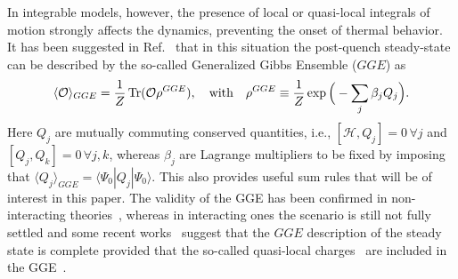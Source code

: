 \documentclass[11pt]{iopart}
\begin{document}
In integrable models, however, the presence of local or 
quasi-local integrals of motion strongly affects the dynamics, preventing the 
onset of thermal behavior. It has been suggested in Ref.~\cite{rigol-2007,
rigol-2008} that in this situation the post-quench steady-state can be described 
by the so-called Generalized Gibbs Ensemble ($GGE$) as 
%
\begin{equation}
\label{gge}
\langle{\mathcal O}\rangle_{GGE}=\frac{1}{Z}\mathop{\mathrm{Tr}}\nolimits({\mathcal O}\rho^{GGE}), 
\quad\textrm{with}\quad\rho^{GGE}\equiv\frac{1}{Z}\exp\Big(-\sum_j\beta_jQ_j\Big). 
\end{equation}
%
Here $Q_j$ are mutually commuting conserved quantities, i.e., $[{\mathcal H},Q_j]=0\,
\forall j$ and $[Q_j,Q_k]=0\,\forall j,k$, whereas $\beta_j$ are Lagrange multipliers 
to be fixed by imposing that  $\langle Q_j\rangle_{GGE}=\langle\Psi_0|Q_j|\Psi_0\rangle$. 
This also provides  useful sum rules that will be of interest in this paper. 
The validity of the GGE has been confirmed in non-interacting theories~\cite{calabrese-2006,
cramer-2008,barthel-2008,rossini-2009,calabrese-2011,cazalilla-2012,se-12,mossel-2012a,
collura-2013,fagotti-2013,kcc14,kcc14a,sotiriadis-2014,bkc-14}, whereas in interacting 
ones the scenario is still not fully settled and some recent works~\cite{ilievski-2015a,
cardy-2015} suggest that the $GGE$ description of the steady state  is complete provided 
that the so-called quasi-local charges~\cite{prosen-2014,pereira-2014,ilievski-2015,essler-2015} 
are included in the GGE~. 
\end{document}
